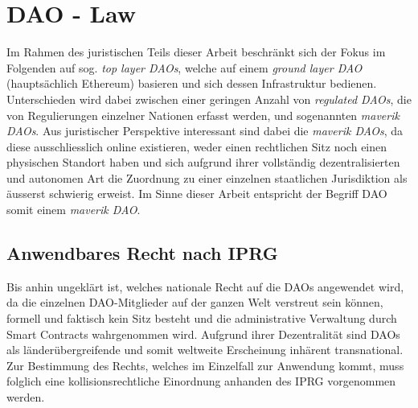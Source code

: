 \documentclass[a4paper,12pt]{report}
\begin{document}
	
	\chapter{DAO - Law}
	
	Im Rahmen des juristischen Teils dieser Arbeit beschränkt sich der Fokus im Folgenden auf sog. \textit{top layer DAOs}, welche auf einem \textit{ground layer DAO} (hauptsächlich Ethereum) basieren und sich dessen Infrastruktur bedienen. 
	Unterschieden wird dabei zwischen einer geringen Anzahl von \textit{regulated DAOs}, die von Regulierungen einzelner Nationen erfasst werden, und sogenannten \textit{maverik DAOs}. Aus juristischer Perspektive interessant sind dabei die \textit{maverik DAOs}, da diese ausschliesslich online existieren, weder einen rechtlichen Sitz noch einen physischen Standort haben und sich aufgrund ihrer vollständig dezentralisierten und autonomen Art die Zuordnung zu einer einzelnen staatlichen Jurisdiktion als äusserst schwierig erweist. Im Sinne dieser Arbeit entspricht der Begriff DAO somit einem \textit{maverik DAO}.
	
		\section{Anwendbares Recht nach IPRG}
	\startsection
	Bis anhin ungeklärt ist, welches nationale Recht auf die DAOs angewendet wird, da die einzelnen DAO-Mitglieder auf der ganzen Welt verstreut sein können, formell und faktisch kein Sitz besteht und die administrative Verwaltung durch Smart Contracts wahrgenommen wird. Aufgrund ihrer Dezentralität sind DAOs als länderübergreifende und somit weltweite Erscheinung inhärent transnational. Zur Bestimmung des Rechts, welches im Einzelfall zur Anwendung kommt, muss folglich eine kollisionsrechtliche Einordnung anhanden des IPRG vorgenommen werden.
	
\end{document}

